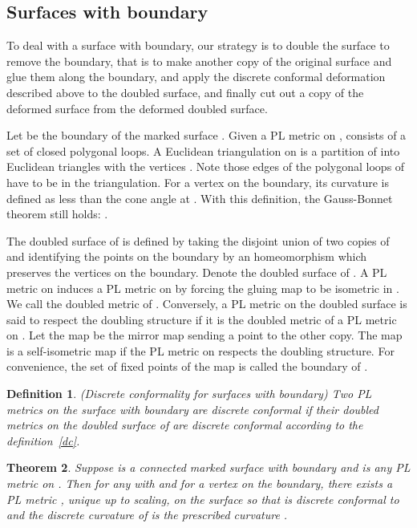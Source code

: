 \documentclass[11pt]{article}
\newtheorem{theorem}{Theorem}[section]
\newtheorem{definition}[theorem]{Definition}
\begin{document}
\subsection{Surfaces with boundary}
\label{surfaceswithboundary}
To deal with a surface with boundary, our strategy is to double the surface to 
remove the boundary, that is to make another
copy of the original surface and glue them along the boundary, and apply 
the discrete conformal deformation described above to the doubled surface, and finally cut out
a copy of the deformed surface from the deformed doubled surface. 

Let  be the boundary of the marked surface . Given a PL metric  on ,  consists
of a set of closed polygonal loops. A Euclidean triangulation on  is a partition of  into 
Euclidean triangles with the vertices . Note those edges of the polygonal loops of  have to be 
in the triangulation. 
For a vertex  on the boundary, its curvature is defined as  less than the cone angle at . 
With this definition, the Gauss-Bonnet theorem still holds: . 

The doubled surface of  is defined by taking the disjoint union of two 
copies of  and identifying the points on the boundary by an homeomorphism 
 which preserves the vertices on the boundary. Denote  
the doubled surface of .  A PL metric  on  induces 
a PL metric  on  by forcing the gluing map  to 
be isometric in . We call  the doubled metric of . 
Conversely, a PL metric on the doubled surface  is said 
to respect the doubling structure if it is the doubled metric of a PL metric on . 
Let the map  be the 
mirror map sending a point to the other copy. The map  is a self-isometric map if 
the PL metric on  respects the doubling structure. 
For convenience, the set of fixed points 
of the map  is called the boundary of .


\begin{definition}
\label{dcwithboundary}(Discrete conformality for surfaces with boundary)
 Two PL metrics  on the surface  with boundary are discrete conformal  if 
 their doubled metrics on the doubled surface of  are discrete conformal according to the definition~\ref{dc}. 
\end{definition}

\begin{theorem}
\label{theorem:dc_boundary} 
Suppose  is a connected marked surface with 
boundary and  is any PL metric on . Then for any  
with  and  for a vertex  on the boundary, 
there exists a PL metric , unique up to scaling, on the surface  
so that  is discrete conformal to  and the discrete curvature
of  is the prescribed curvature . 
\end{theorem}
\end{document}
